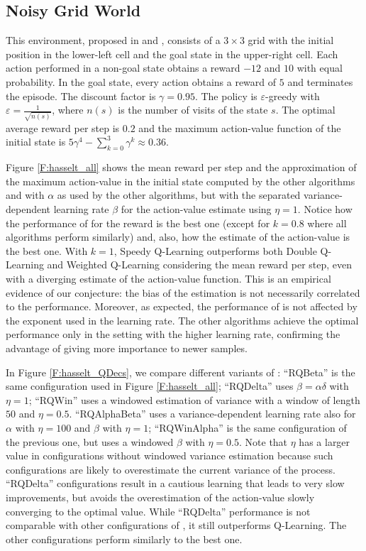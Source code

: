 \documentclass[conference]{IEEEtran}
\begin{document}
\subsection{Noisy Grid World}
This environment, proposed in \cite{van2010double}  and \cite{d2016estimating}, consists of a $3 \times 3$ grid with the initial position in the lower-left cell and the goal state in the upper-right cell. Each action performed in a non-goal state obtains a reward $-12$ and $10$ with equal probability. In the goal state, every action obtains a reward of $5$ and terminates the episode. The discount factor is $\gamma = 0.95$. The policy is $\varepsilon$-greedy with $\varepsilon = \frac{1}{\sqrt{n(s)}}$, where $n(s)$ is the number of  visits of the state $s$. The optimal average reward per step is $0.2$ and the maximum action-value function of the initial state is $5\gamma^4 - \sum_{k=0}^3 \gamma^k \approx 0.36$.

Figure \ref{F:hasselt_all} shows the mean reward per step and the approximation of the maximum action-value in the initial state computed by the other algorithms and \alg with $\alpha$ as used by the other algorithms, but with the separated variance-dependent learning rate $\beta$ for the action-value estimate using $\eta = 1$. Notice how the performance of \alg for the reward is the best one (except for $k=0.8$ where all algorithms perform similarly) and, also, how the estimate of the action-value is the best one. With $k=1$, Speedy Q-Learning outperforms both Double Q-Learning and Weighted Q-Learning considering the mean reward per step, even with a diverging estimate of the action-value function. This is an empirical evidence of our conjecture: the bias of the estimation is not necessarily correlated to the performance. Moreover, as expected, the performance of \alg is not affected by the exponent used in the learning rate. The other algorithms achieve the optimal performance only in the setting with the higher learning rate, confirming the advantage of giving more importance to newer samples.

In Figure \ref{F:hasselt_QDecs}, we compare different variants of \alg: ``RQBeta'' is the same configuration used in Figure \ref{F:hasselt_all}; ``RQDelta'' uses $\beta = \alpha \delta$ with $\eta = 1$; ``RQWin'' uses a windowed estimation of variance with a window of length $50$ and $\eta = 0.5$. ``RQAlphaBeta'' uses a variance-dependent learning rate also for $\alpha$ with $\eta = 100$ and $\beta$ with $\eta = 1$; ``RQWinAlpha'' is the same configuration of the previous one, but uses a windowed $\beta$ with $\eta = 0.5$. Note that $\eta$ has a larger value in configurations without windowed variance estimation because such configurations are likely to overestimate the current variance of the process. ``RQDelta'' configurations result in a cautious learning that leads to very slow improvements, but avoids the overestimation of the action-value slowly converging to the optimal value. While ``RQDelta'' performance is not comparable with other configurations of \alg, it still outperforms Q-Learning. The other configurations perform similarly to the best one.
\end{document}
